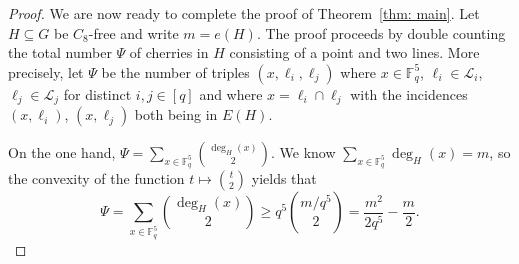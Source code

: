\documentclass[A4paper,reqno,oneside,11pt]{amsart}
\theoremstyle{plain}
\theoremstyle{definition}
\newcommand{\scL}{\mathscr{L}}
\newcommand{\F}{\mathbb{F}}
\def\l{\ell}
\begin{document}
\begin{proof}
    We are now ready to complete the proof of Theorem~\ref{thm: main}.
    Let $H\subseteq G$ be $C_8$-free and write $m=e(H)$. 
    The proof proceeds by double counting the total number $\Psi$ of cherries in $H$ consisting of a point and two lines.
    More precisely, let $\Psi$ be the number of triples $(x,\l_i,\l_j)$ where $x \in \F_q^5$, $\l_i \in \scL_i$, $\l_j \in \scL_j$ for distinct $i, j \in [q]$ and where $x = \l_i \cap \l_j$ with the incidences $(x,\l_i)$, $(x,\l_j)$ both being in $E(H)$. 

    On the one hand, $\Psi = \sum_{x \in \F_q^5} \binom{\deg_H(x)}{2}$. 
    We know  $\sum_{x \in \F_q^5} \deg_H(x) = m$, so the convexity of the function $t \mapsto \binom{t}{2}$ yields that
    \begin{equation}
    \label{eq: psi-one-hand}
        \Psi 
        = \sum_{x\in \F_q^5} \binom{\deg_H(x)}{2}
        \geq q^5\binom{m/q^5}{2}
        =\frac{m^2}{2q^5}-\frac{m}{2}.
    \end{equation}


\end{proof}
\end{document}
